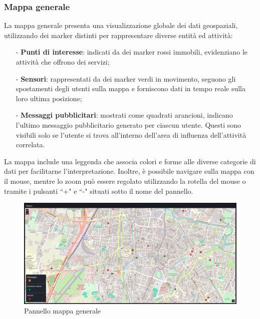 \documentclass[10pt]{article}
\begin{document}
\begin{justify}
    \subsubsection{Mappa generale}
    La mappa generale presenta una visualizzazione globale dei dati geospaziali, utilizzando dei marker distinti per rappresentare diverse entità ed attività:
    \begin{itemize}
        \item[-] \textbf{Punti di interesse}: indicati da dei marker rossi immobili, evidenziano le attività che offrono dei servizi;
        \item[-] \textbf{Sensori}: rappresentati da dei marker verdi in movimento, seguono gli spostamenti degli utenti sulla mappa e forniscono dati in tempo reale sulla loro ultima posizione;
        \item[-] \textbf{Messaggi pubblicitari}: mostrati come quadrati arancioni, indicano l'ultimo messaggio pubblicitario generato per ciascun utente. Questi sono visibili solo se l'utente si trova all'interno dell'area di influenza dell'attività correlata.
    \end{itemize}
    La mappa include una leggenda che associa colori e forme alle diverse categorie di dati per facilitarne l'interpretazione. Inoltre, è possibile navigare sulla mappa con il mouse, mentre lo zoom può essere regolato utilizzando la rotella del mouse o tramite i pulsanti ``+" e ``-" situati sotto il nome del pannello.
    \begin{figure}[H]
    \centering
    \includegraphics[width=1\linewidth]{mappa.png}
    \caption{Pannello mappa generale}
    \end{figure}
    

\end{justify}
\end{document}
